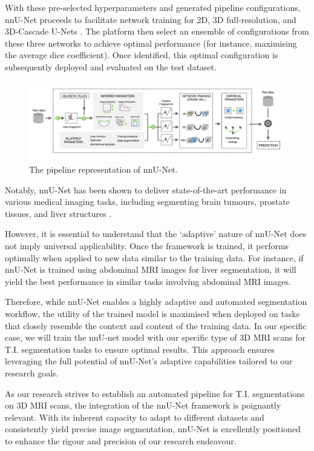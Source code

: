 With these pre-selected hyperparameters and generated pipeline configurations, nnU-Net proceeds to facilitate network training for 2D, 3D full-resolution, and 3D-Cascade U-Nets \cite{isensee2018nnu}. The platform then select an ensemble of configurations from these three networks to achieve optimal performance (for instance, maximising the average dice coefficient). Once identified, this optimal configuration is subsequently deployed and evaluated on the test dataset.

\begin{figure}[htp]
    \centering
    \includegraphics[width=\textwidth]{./figures/nnunet.png}
    \caption{The pipeline representation of nnU-Net.}
    \label{fig:nnu-net}
\end{figure}

Notably, nnU-Net has been shown to deliver state-of-the-art performance in various medical imaging tasks, including segmenting brain tumours, prostate tissues, and liver structures \cite{isensee2019nnu}.

However, it is essential to understand that the `adaptive' nature of nnU-Net does not imply universal applicability. Once the framework is trained, it performs optimally when applied to new data similar to the training data. For instance, if nnU-Net is trained using abdominal MRI images for liver segmentation, it will yield the best performance in similar tasks involving abdominal MRI images.

Therefore, while nnU-Net enables a highly adaptive and automated segmentation workflow, the utility of the trained model is maximised when deployed on tasks that closely resemble the context and content of the training data. In our specific case, we will train the nnU-net model with our specific type of 3D MRI scans for T.I. segmentation tasks to ensure optimal results. This approach ensures leveraging the full potential of nnU-Net's adaptive capabilities tailored to our research goals.

As our research strives to establish an automated pipeline for T.I. segmentations on 3D MRI scans, the integration of the nnU-Net framework is poignantly relevant. With its inherent capacity to adapt to different datasets and consistently yield precise image segmentation, nnU-Net is excellently positioned to enhance the rigour and precision of our research endeavour.

